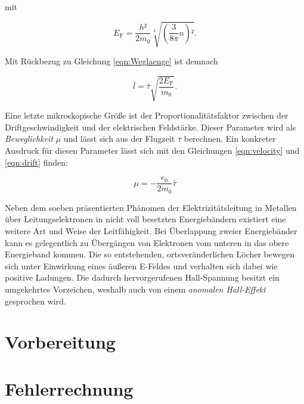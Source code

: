 \noindent mit 

\begin{equation*}
    E_\text{F} = \frac{h²}{2m_0}\sqrt[3]{\left(\frac{3}{8\pi}n\right)²}.
\end{equation*}

\noindent Mit Rückbezug zu Gleichung \eqref{eqn:Weglaenge} ist demnach 

\begin{equation}
    \label{eqn:mitlaenge}
    \bar{l} = \bar{\tau}\sqrt{\frac{2E_\text{F}}{m_0}}.
\end{equation}

\noindent Eine letzte mikroskopische Größe ist der Proportionalitätsfaktor zwischen der Driftgeschwindigkeit und der
elektrischen Feldstärke. Dieser Parameter wird als \emph{Beweglichkeit} $\mu$ und lässt sich aus der Flugzeit
$\bar{\tau}$ berechnen. Ein konkreter Ausdruck für diesen Parameter lässt sich mit den Gleichungen \eqref{eqn:velocity}
und \eqref{eqn:drift} finden:

\begin{equation}
\label{eqn:Beweglichkeit}
    \mu = -\frac{e_0}{2m_0}\bar{\tau}
\end{equation}

\noindent Neben dem soeben präsentierten Phänomen der Elektrizitätsleitung in Metallen
über Leitungselektronen in nicht voll besetzten Energiebändern existiert eine weitere Art und Weise der Leitfähigkeit.
Bei Überlappung zweier Energiebänder kann es gelegentlich zu Übergängen von Elektronen vom unteren in das 
obere Energieband kommen. Die so entstehenden, ortsveränderlichen Löcher bewegen sich unter Einwirkung eines äußeren 
E-Feldes und verhalten sich dabei wie positive Ladungen. Die dadurch hervorgerufenen Hall-Spannung besitzt ein 
umgekehrtes Vorzeichen, weshalb auch von einem \emph{anomalen Hall-Effekt} gesprochen wird. 

\section{Vorbereitung}


\section{Fehlerrechnung}
